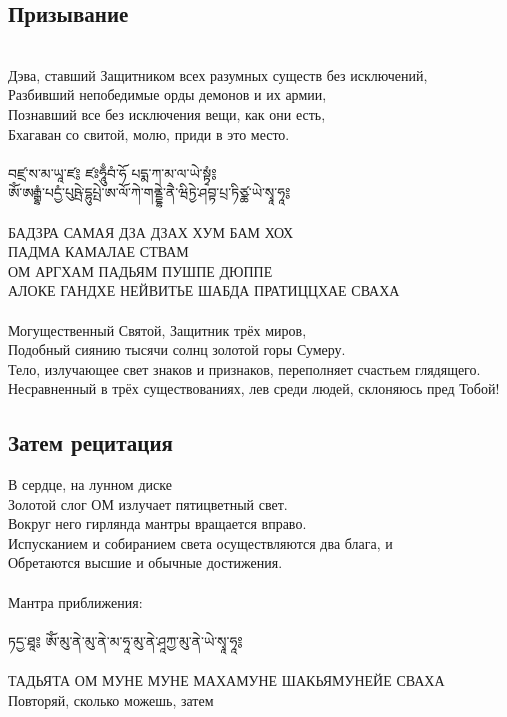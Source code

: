 \subsection*{Призывание}
\\
Дэва, ставший Защитником всех разумных существ без исключений,\\
Разбивший непобедимые орды демонов и их армии,\\
Познавший все без исключения вещи, как они есть,\\
Бхагаван со свитой, молю, приди в это место.\\
\\
\ti
བཛྲ་ས་མ་ཡཱ་ཛ༔ ཛཿཧཱུྃབཾ་ཧོ པདྨ་ཀ་མ་ལ་ཡེ་སྟྭཾ༔ \\
ཨོཾ་ཨརྒྷཾ་པདྱཾ་པུཥྤེ་དྷུཔྤེ་ཨ་ལོ་ཀེ་གནྡྷེ་ནཻ་ཝིཏྱེ་ཤབྟ་པྲ་ཏིཙྪ་ཡེ་སྭཱ་ཧཱ༔ \\
\\
\ru
БАДЗРА САМАЯ ДЗА ДЗАХ ХУМ БАМ ХОХ \\
ПАДМА КАМАЛАЕ СТВАМ\\
ОМ АРГХАМ ПАДЬЯМ ПУШПЕ ДЮППЕ\\
АЛОКЕ ГАНДХЕ НЕЙВИТЬЕ ШАБДА ПРАТИЦЦХАЕ СВАХА\\
\\
Могущественный Святой, Защитник трёх миров,\\
Подобный сиянию тысячи солнц золотой горы Сумеру.\\
Тело, излучающее свет знаков и признаков, переполняет счастьем глядящего.\\
Несравненный в трёх существованиях, лев среди людей, склоняюсь пред Тобой!

\subsection*{Затем рецитация}
В сердце, на лунном диске\\
Золотой слог ОМ излучает пятицветный свет.\\
Вокруг него гирлянда мантры вращается вправо.\\
Испусканием  и собиранием света осуществляются два блага, и\\
Обретаются высшие и обычные достижения.\\
\\
Мантра приближения:\\
\\
\ti ཏདྱ་ཐཱ༔ ཨོཾ་མུ་ནེ་མུ་ནེ་མ་ཧཱ་མུ་ནེ་ཤཱཀྱ་མུ་ནེ་ཡེ་སྭཱ་ཧཱ༔\\
\noindent \ru \\
ТАДЬЯТА ОМ МУНЕ МУНЕ МАХАМУНЕ ШАКЬЯМУНЕЙЕ СВАХА\\
\scriptsize Повторяй, сколько можешь, затем \normalsize

